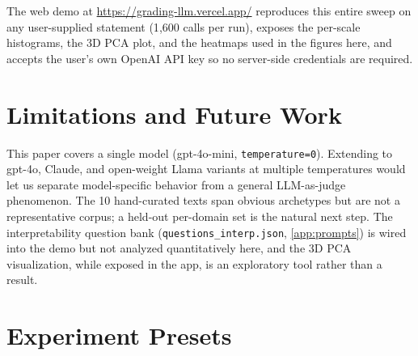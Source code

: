 \documentclass[11pt]{article}
\begin{document}
The web demo at \url{https://grading-llm.vercel.app/} reproduces this entire sweep on any user-supplied statement (1{,}600 calls per run), exposes the per-scale histograms, the 3D PCA plot, and the heatmaps used in the figures here, and accepts the user's own OpenAI API key so no server-side credentials are required.

\section{Limitations and Future Work}
\label{sec:limits}

This paper covers a single model (gpt-4o-mini, \texttt{temperature=0}). Extending to gpt-4o, Claude, and open-weight Llama variants at multiple temperatures would let us separate model-specific behavior from a general LLM-as-judge phenomenon. The 10 hand-curated texts span obvious archetypes but are not a representative corpus; a held-out per-domain set is the natural next step. The interpretability question bank (\texttt{questions\_interp.json}, \autoref{app:prompts}) is wired into the demo but not analyzed quantitatively here, and the 3D PCA visualization, while exposed in the app, is an exploratory tool rather than a result.

\appendix

\section{Experiment Presets}
\label{app:presets}
\end{document}
